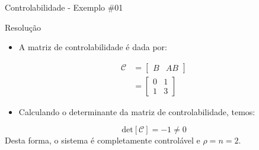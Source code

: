 \begin{frame}{Controlabilidade - Exemplo \#01}
\begin{block}{Resolução}
\begin{itemize}
    \item A matriz de controlabilidade é dada por:
\end{itemize}
\begin{align*}
    \mathcal{C} &= \begin{bmatrix} B & AB \end{bmatrix} \\
    &= \begin{bmatrix} 0 & 1 \\ 1 & 3 \end{bmatrix}
\end{align*}
\vspace{-0.3cm}
\begin{itemize}
    \item Calculando o determinante da matriz de controlabilidade, temos:
\end{itemize}
$$\text{det}[\mathcal{C}] = -1 \neq 0 $$
Desta forma, o sistema é completamente controlável e $\rho = n = 2$.
\end{block}
\end{frame}

\cprotect{}

